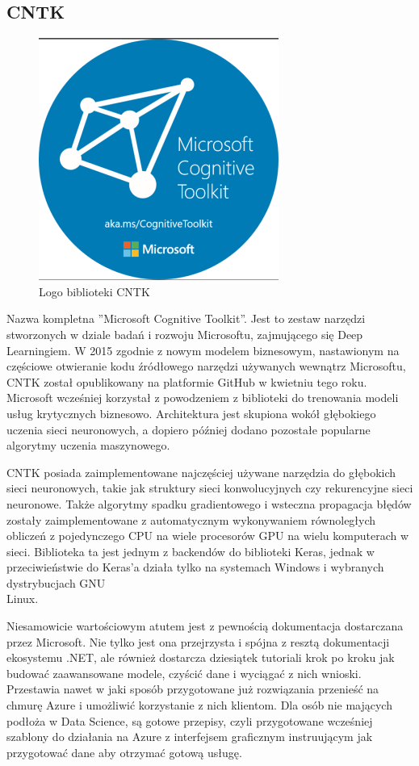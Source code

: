 \documentclass[12pt,a4paper,twoside,titlepage,openright]{book}
\begin{document}
\subsection{CNTK}
\begin{figure}[h]
	\centering
			\includegraphics[resolution=120]{CNTK.png}
		\caption{Logo biblioteki CNTK}
\end{figure}
Nazwa kompletna ''Microsoft Cognitive Toolkit''. Jest to zestaw narzędzi stworzonych w dziale badań i rozwoju Microsoftu, zajmującego się Deep Learningiem. W 2015 zgodnie z nowym modelem biznesowym, nastawionym na częściowe otwieranie kodu źródłowego narzędzi używanych wewnątrz Microsoftu, CNTK został opublikowany na platformie GitHub w kwietniu tego roku. Microsoft wcześniej korzystał z powodzeniem z biblioteki do trenowania modeli usług krytycznych biznesowo. Architektura jest skupiona wokół głębokiego uczenia sieci neuronowych, a dopiero później dodano pozostałe popularne algorytmy uczenia maszynowego.

CNTK posiada zaimplementowane najczęściej używane narzędzia do głębokich sieci neuronowych, takie jak struktury sieci konwolucyjnych czy rekurencyjne sieci neuronowe. Także algorytmy spadku gradientowego i wsteczna propagacja błędów zostały zaimplementowane z automatycznym wykonywaniem równoległych obliczeń z pojedynczego CPU na wiele procesorów GPU na wielu komputerach w sieci. Biblioteka ta jest jednym z backendów do biblioteki Keras, jednak w przeciwieństwie do Keras'a działa tylko na systemach Windows i wybranych dystrybucjach GNU\\Linux.

Niesamowicie wartościowym atutem jest z pewnością dokumentacja dostarczana przez Microsoft. Nie tylko jest ona przejrzysta i spójna z resztą dokumentacji ekosystemu .NET, ale również dostarcza dziesiątek tutoriali krok po kroku jak budować zaawansowane modele, czyścić dane i wyciągać z nich wnioski. Przestawia nawet w jaki sposób przygotowane już rozwiązania przenieść na chmurę Azure i umożliwić korzystanie z nich klientom. Dla osób nie mających podłoża w Data Science, są gotowe przepisy, czyli przygotowane wcześniej szablony do działania na Azure z interfejsem graficznym instruującym jak przygotować dane aby otrzymać gotową usługę. \cite{book:2187021}
\end{document}
